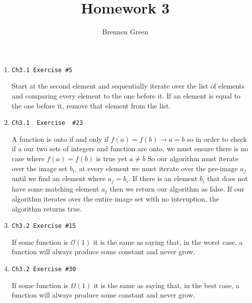 \documentclass[12pt]{article}
\begin{document}
\title{Homework 3}
\author{Brennen Green}
\maketitle


\begin{enumerate}
    \item \begin{verbatim}Ch3.1 Exercise #5\end{verbatim}
        Start at the second element and sequentially iterate over the list of elements and comparing
        every element to the one before it. If an element is equal to the one before it, remove that
        element from the list.
    \item \begin{verbatim}Ch3.1  Exercise  #23\end{verbatim}
        A function is onto  if and only if $ f(a) = f(b) \rightarrow a = b $ so in order to check
        if a our two sets of integers and function are onto, we must ensure there is no case where
        $ f(a) = f(b) $ is true yet $ a \ne b $ \newline \newline
        So our algorithm must iterate over the image set $ b_i $, at every element we must iterate over 
        the pre-image $ a_j $ until we find an element where $ a_j = b_i $. If there is an element 
        $ b_i $ that does not have some matching element $ a_j $ then we return our algorithm as
        false. If our algorithm iterates over the entire image set with no interuption, the algorithm
        returns true. 
    \item \begin{verbatim}Ch3.2 Exercise #15\end{verbatim}
        If some function is $ \mathcal{O}(1) $ it is the same as saying that, in the worst case, a function
        will always produce some constant and never grow.
    \item \begin{verbatim}Ch3.2 Exercise #30\end{verbatim}
        If some function is $ \Omega(1) $ it is the same as saying that, in the best case, a function
        will always produce some constant and never grow.
        
    \newpage


\end{enumerate}
\end{document}
